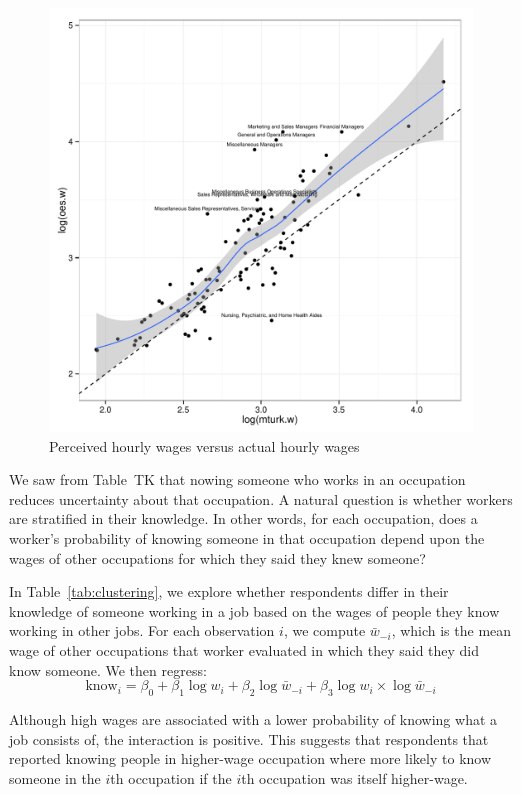 \documentclass[11pt]{article}
\begin{document}
\begin{figure}
\caption{Perceived hourly wages versus actual hourly wages \label{fig:prediction_scatter}} 
\centering 
\includegraphics[width = \linewidth]{./plots/predicted_v_actual.pdf} 
\end{figure} 

We saw from Table~TK that nowing someone who works in an occupation reduces uncertainty about that occupation. 
A natural question is whether workers are stratified in their knowledge. 
In other words, for each occupation, does a worker's probability of knowing someone in that occupation depend upon the wages of other occupations for which they said they knew someone? 

In Table~\ref{tab:clustering}, we explore whether respondents differ in their knowledge of someone working in a job based on the wages of people they know working in other jobs. 
For each observation $i$, we compute $\bar{w}_{-i}$, which is the mean wage of other occupations that worker evaluated in which they said they did know someone.  
We then regress: 
\begin{equation}
\mbox{know}_i = \beta_0 + \beta_1 \log w_i + \beta_2 \log \bar{w}_{-i} + \beta_3 \log w_i \times \log \bar{w}_{-i} 
\end{equation} 

Although high wages are associated with a lower probability of knowing what a job consists of, the interaction is positive. 
This suggests that respondents that reported knowing people in higher-wage occupation where more likely to know someone in the $i$th occupation if the $i$th occupation was itself higher-wage. 
\end{document}
